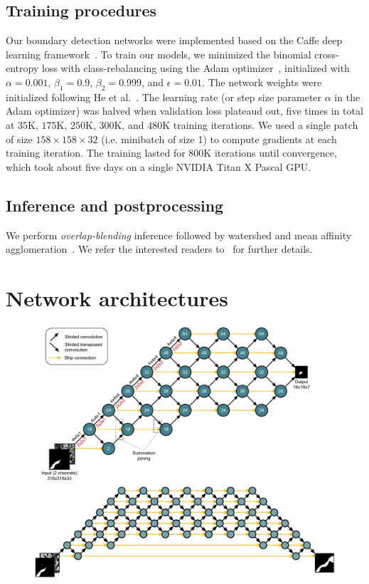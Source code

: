 \documentclass{article}
\begin{document}
\begin{appendices}
\subsection{Training procedures}
Our boundary detection networks were implemented based on the Caffe deep
learning framework~\cite{jia2014caffe}. To train our models, we minimized the
binomial cross-entropy loss with class-rebalancing using the Adam
optimizer~\cite{adam}, initialized with $\alpha=0.001$, $\beta_1=0.9$,
$\beta_2=0.999$, and $\epsilon=0.01$. The network weights were initialized
following He et al.~\cite{he2015delving}. The learning rate (or step size
parameter $\alpha$ in the Adam optimizer) was halved when validation loss
plateaud out, five times in total at $35$K, $175$K, $250$K, $300$K, and
$480$K training iterations. We used a single patch of size
$158\times158\times32$ (i.e. minibatch of size 1) to compute gradients at each
training iteration. The training lasted for $800$K iterations until convergence,
which took about five days on a single NVIDIA Titan X Pascal GPU.

\subsection{Inference and postprocessing}
We perform \emph{overlap-blending} inference followed by watershed and mean affinity agglomeration~\cite{kisuk}. We refer the interested readers to~\cite{kisuk} for further details.

\section{Network architectures}
\label{appendix:architecture}

\begin{figure}
\centering
\includegraphics[width=1.0\linewidth]{detector.pdf}
\centering
\includegraphics[width=1.0\linewidth]{corrector2.pdf}


\end{figure}
\end{appendices}
\end{document}
